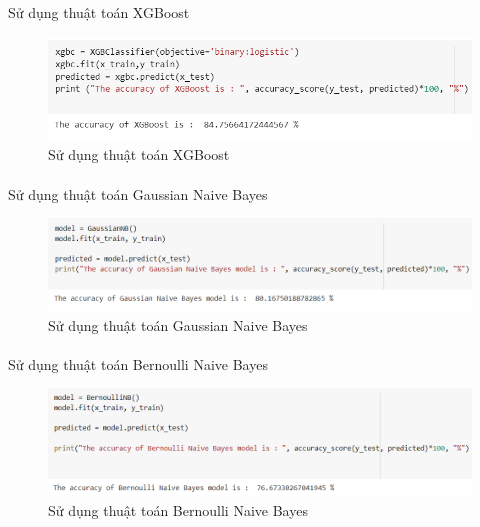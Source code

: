 \documentclass{article}
\begin{document}
\paragraph{}Sử dụng thuật toán XGBoost
\begin{figure}[!h]
	\begin{center}
		\includegraphics[width=\linewidth]{images/code30.png}
		\caption{\fontsize{14}{20}\selectfont Sử dụng thuật toán XGBoost}
	\end{center}
\end{figure}
\paragraph{}Sử dụng thuật toán Gaussian Naive Bayes
\begin{figure}[!h]
	\begin{center}
		\includegraphics[width=\linewidth]{images/code31.png}
		\caption{\fontsize{14}{20}\selectfont Sử dụng thuật toán Gaussian Naive Bayes}
	\end{center}
\end{figure}
\paragraph{}Sử dụng thuật toán Bernoulli Naive Bayes
\begin{figure}[!h]
	\begin{center}
		\includegraphics[width=\linewidth]{images/code32.png}
		\caption{\fontsize{14}{20}\selectfont Sử dụng thuật toán Bernoulli Naive Bayes}
	\end{center}
\end{figure}
\pagebreak
\end{document}
